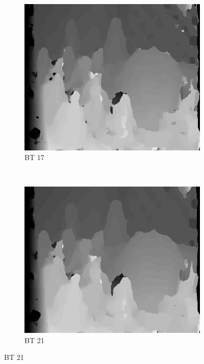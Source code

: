 \begin{figure}
\begin{subfigure}[b]{0.23\textwidth}
    \centering
    \includegraphics[width=\textwidth]{images/stereo-pairs/cones_bt_17.png}
    \caption{BT 17}
  \end{subfigure}
  ~
  \begin{subfigure}[b]{0.23\textwidth}
    \centering
    \includegraphics[width=\textwidth]{images/stereo-pairs/cones_bt_21.png}
    \caption{BT 21}
  \end{subfigure}


\end{figure}
